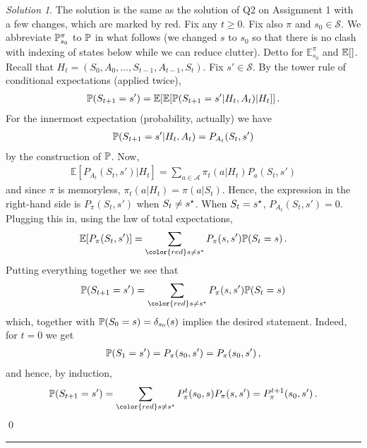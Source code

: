 \documentclass{article}
\DeclareMathOperator*{\1}{\mathbbm{1}}
\newcommand{\E}{\mathbb E}
\newcommand{\EE}[1]{\E[#1]}
\theoremstyle{definition}
\theoremstyle{remark}
\newtheorem*{solution*}{Solution}
\newcommand{\cS}{\mathcal{S}}
\newcommand{\cA}{\mathcal{A}}
\begin{document}
\begin{solution*}
The solution is the same as the solution of Q2 on Assignment 1 with a few changes, which are marked by {\color{red} red}.
Fix any $t\ge 0$. Fix also $\pi$ and $s_0\in \cS$. We abbreviate $\mathbb{P}_{s_0}^\pi$ to $\mathbb{P}$ in what follows (we changed $s$ to $s_0$ so that there is no clash with indexing of states below while we can reduce clutter).
Detto for $\E_{s_0}^\pi$ and $\EE$.
Recall that $H_t = (S_0,A_0,\dots,S_{t-1},A_{t-1},S_t)$.
Fix $s'\in \cS$.
By the tower rule of conditional expectations (applied twice),
\begin{align*}
\PP(S_{t+1}=s')
=\EE{ \EE{ \PP(S_{t+1}=s'|H_t,A_t)  | H_t } }\,.
\end{align*}
For the innermost expectation (probability, actually) we have
\begin{align*}
\mathbb{P}(S_{t+1}=s'|H_t,A_t) = P_{A_t}(S_t,s')
\end{align*}
by the construction of $\mathbb{P}$.
Now,
\begin{align*}
\EE{ P_{A_t}(S_t,s') | H_t } = \sum_{a\in \cA} \pi_t(a|H_t) P_a(S_t,s')
\end{align*}
and since $\pi$ is memoryless, $\pi_t(a|H_t) = \pi(a|S_t)$. 
Hence, the expression in the right-hand side is $P_\pi(S_t,s')$ {\color{red} when $S_t\ne s^{\star}$.
When $S_t=s^{\star}$, $P_{A_t}(S_t,s')=0$.
}
Plugging this in, using the law of total expectations,
\begin{align*}
\EE{ P_{\pi}(S_t,s') } =
 \sum_{{\color{red} s \ne \term}} P_{\pi}(s,s') \PP(S_t=s)\,.
\end{align*}
Putting everything together we see that
\begin{align*}
\PP(S_{t+1}=s') = \sum_{{\color{red} s \ne \term}} P_{\pi}(s,s') \PP(S_t=s)
\end{align*}
which, together with $\mathbb{P}(S_0=s)=\delta_{s_0}(s)$ implies the desired statement.
Indeed, for $t=0$ we get
\begin{align*}
\mathbb{P}(S_{1}=s') = P_{\pi}(s_0,s') = P_{\pi}(s_0,s')\,,
\end{align*}
and hence, by induction,
\begin{align*}
\PP(S_{t+1}=s') = \sum_{{\color{red} s \ne \term}}  P_\pi^t(s_0,s) P_{\pi}(s,s')
= P_\pi^{t+1}(s_0,s')\,.
\end{align*}
\qed\par\smallskip\hrule
\end{solution*}
\end{document}
